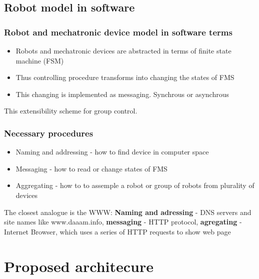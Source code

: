 \documentclass{beamer}
\begin{document}
\subsection{Robot model in software}
\begin{frame}
\frametitle{Robot and mechatronic device model in software terms}

\begin{itemize}
\item Robots and mechatronic devices are abstracted in terms of finite state
machine (FSM)
\item Thus controlling procedure transforms into changing the states of FMS
\item This changing is implemented as messaging. Synchrous or asynchrous
\end{itemize}
This extensibility scheme for group control.


\end{frame}

\begin{frame}
\frametitle{Necessary procedures}

\begin{itemize}
\item Naming and addressing - how to find device in computer space
\item Messaging - how to read or change states of FMS
\item Aggregating - how to to assemple a robot or group of robots from 
plurality of devices
\end{itemize}


The closest analogue is the WWW: \textbf{Naming and adressing} - DNS servers and
site names like www.daaam.info, \textbf{messaging} - HTTP protocol,
\textbf{agregating} - Internet Browser, which uses a series of HTTP requests to show web page
\end{frame}
\section{Proposed architecure}
\end{document}
